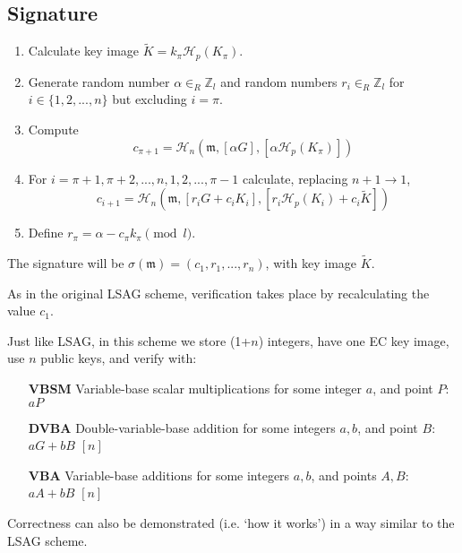 \subsection*{Signature}


\begin{enumerate}
	\item Calculate key image \(\tilde{K} = k_\pi \mathcal{H}_p(K_\pi)\).
	
	\item Generate random number \(\alpha \in_R \mathbb{Z}_l\) and random numbers  \(r_i \in_R \mathbb{Z}_l\) for \(i \in \{1, 2, ..., n\}\) but excluding \(i = \pi\).
	
	\item Compute
	\[c_{\pi+1} = \mathcal{H}_n(\mathfrak{m}, [\alpha G], [\alpha \mathcal{H}_p(K_\pi)])\]
	
	\item For \(i = \pi+1, \pi+2, ..., n, 1, 2, ..., \pi-1\) calculate, replacing \(n + 1 \rightarrow 1\),
	\[  c_{i+1} = \mathcal{H}_n(\mathfrak{m}, [r_i G + c_i K_i], [r_i \mathcal{H}_p(K_i) + c_i \tilde{K}])  \] 
	
	
	\item Define \(r_\pi = \alpha - c_\pi k_\pi \pmod l\).
	
\end{enumerate}

The signature will be \(\sigma(\mathfrak{m}) = (c_1, r_1, ..., r_n) \), with key image $\tilde{K}$.

As in the original LSAG scheme, verification takes place by recalculating the value \(c_1\).

Just like LSAG, in this scheme we store (1+$n$) integers, have one EC key image, use $n$ public keys, and verify with:

\begin{itemize}
    \setlength\itemsep{\listspace}
    \item [\textbf{VBSM}] Variable-base scalar multiplications for some integer $a$, and point $P$: $a P$ \quad [1]
    \item [\textbf{DVBA}] Double-variable-base addition for some integers $a, b$, and point $B$: $a G + b B$ \quad \([n]\)
    \item [\textbf{VBA}] Variable-base additions for some integers $a, b$, and points $A, B$: $a A + b B$ \quad \([n]\)
\end{itemize}

Correctness can also be demonstrated (i.e. `how it works') in a way similar to the LSAG scheme.


